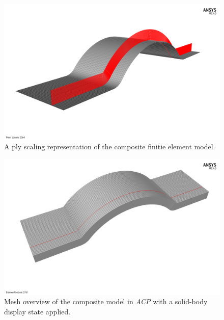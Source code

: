 \begin{figure}[htp]
\centering
\includegraphics[width=1\textwidth]{./figures/fea/fea-acp-ply-scaling}
\caption{A ply scaling representation of the composite finitie element model.}
\label{fig:fea-acp-ply-scaling}
\end{figure}


\begin{figure}[htp]
\centering
\includegraphics[width=1\textwidth]{./figures/fea/fea-acp-solidmodel-mesh}
\caption{Mesh overview of the composite model in \textit{ACP} with a solid-body display state applied.}
\label{fig:fea-acp-solidmodel-mesh}
\end{figure}

